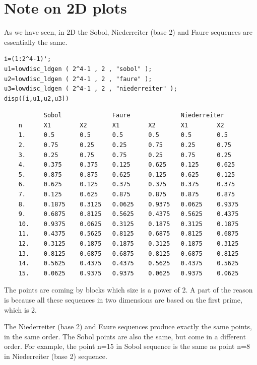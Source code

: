    
\section{Note on 2D plots}
	
	  As we have seen, in 2D the Sobol, Niederreiter (base 2) and 
	  Faure sequences are essentially the same. 
	

	\lstset{language=scilabscript}
\begin{lstlisting}
i=(1:2^4-1)';
u1=lowdisc_ldgen ( 2^4-1 , 2 , "sobol" );
u2=lowdisc_ldgen ( 2^4-1 , 2 , "faure" );
u3=lowdisc_ldgen ( 2^4-1 , 2 , "niederreiter" );
disp([i,u1,u2,u3])
\end{lstlisting}

\lstset{language=scilabscript}
\begin{lstlisting}
           Sobol              Faure              Niederreiter        
    n      X1        X2       X1        X2       X1        X2        
    1.     0.5       0.5      0.5       0.5      0.5       0.5       
    2.     0.75      0.25     0.25      0.75     0.25      0.75      
    3.     0.25      0.75     0.75      0.25     0.75      0.25      
    4.     0.375     0.375    0.125     0.625    0.125     0.625     
    5.     0.875     0.875    0.625     0.125    0.625     0.125     
    6.     0.625     0.125    0.375     0.375    0.375     0.375     
    7.     0.125     0.625    0.875     0.875    0.875     0.875     
    8.     0.1875    0.3125   0.0625    0.9375   0.0625    0.9375    
    9.     0.6875    0.8125   0.5625    0.4375   0.5625    0.4375    
    10.    0.9375    0.0625   0.3125    0.1875   0.3125    0.1875    
    11.    0.4375    0.5625   0.8125    0.6875   0.8125    0.6875    
    12.    0.3125    0.1875   0.1875    0.3125   0.1875    0.3125    
    13.    0.8125    0.6875   0.6875    0.8125   0.6875    0.8125    
    14.    0.5625    0.4375   0.4375    0.5625   0.4375    0.5625    
    15.    0.0625    0.9375   0.9375    0.0625   0.9375    0.0625    
\end{lstlisting}
	
	  The points are coming by blocks which size is a power of 2. 
	  A part of the reason is because all these sequences 
	  in two dimensions are based on the first prime, which is 2.
	
	
	  The Niederreiter (base 2) and Faure sequences produce 
	  exactly the same points, in the same order. 
	  The Sobol points are also the same, but come in a different order. 
	  For example, the point n=15 in Sobol sequence 
	  is the same as point n=8 in Niederreiter (base 2) sequence.
	
